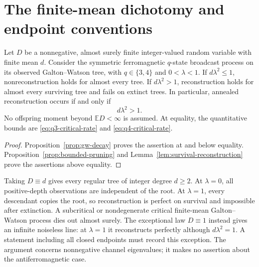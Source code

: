 \section{The finite-mean dichotomy and endpoint conventions}
\label{sec:full-gw-dichotomy}

\begin{theorem}
\label{thm:full-finite-mean-dichotomy}
Let $D$ be a nonnegative, almost surely finite integer-valued random
variable with finite mean $d$.  Consider the symmetric ferromagnetic
$q$-state broadcast process on its observed Galton--Watson tree, with
$q\in\{3,4\}$ and $0<\lambda<1$.
If $d\lambda^2\le1$, nonreconstruction holds for almost every tree.
If $d\lambda^2>1$, reconstruction holds for almost every surviving
tree and fails on extinct trees.  In particular, annealed reconstruction
occurs if and only if
\[
 d\lambda^2>1.
\]
No offspring moment beyond $\mathbb E D<\infty$ is assumed.  At equality,
the quantitative bounds are \eqref{eq:q3-critical-rate} and
\eqref{eq:q4-critical-rate}.
\end{theorem}

\begin{proof}
Proposition~\ref{prop:gw-decay} proves the assertion at and below equality.
Proposition~\ref{prop:bounded-pruning} and
Lemma~\ref{lem:survival-reconstruction} prove the assertions above equality.
\end{proof}

\begin{remark}
Taking $D\equiv d$ gives every regular tree of integer degree $d\ge2$.
At $\lambda=0$, all positive-depth observations are independent of the
root.  At $\lambda=1$, every descendant copies the root, so reconstruction
is perfect on survival and impossible after extinction.  A subcritical
or nondegenerate critical finite-mean Galton--Watson process dies out
almost surely.  The exceptional law $D\equiv1$ instead gives an infinite
noiseless line: at $\lambda=1$ it reconstructs perfectly although
$d\lambda^2=1$.  A statement including all closed endpoints must record
this exception.  The argument concerns nonnegative channel eigenvalues;
it makes no assertion about the antiferromagnetic case.
\end{remark}
